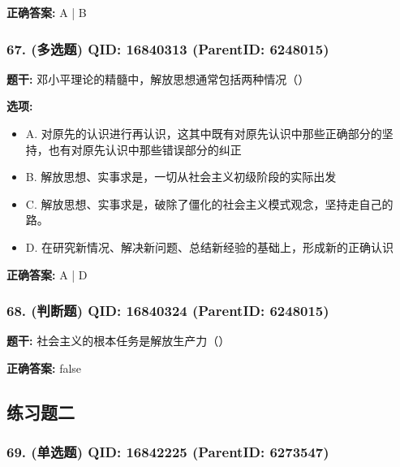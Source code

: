 \documentclass[12pt,UTF8]{ctexart}
\begin{document}
\textbf{正确答案:}
A | B

\vspace{0.3em}\hrulefill\vspace{0.7em}

\subsubsection*{67. (多选题) \small QID: 16840313 (ParentID: 6248015)}

\textbf{题干:}
邓小平理论的精髓中，解放思想通常包括两种情况（）



\textbf{选项:}
\begin{itemize}[leftmargin=*]

  \item A. 对原先的认识进行再认识，这其中既有对原先认识中那些正确部分的坚持，也有对原先认识中那些错误部分的纠正

  \item B. 解放思想、实事求是，一切从社会主义初级阶段的实际出发

  \item C. 解放思想、实事求是，破除了僵化的社会主义模式观念，坚持走自己的路。

  \item D. 在研究新情况、解决新问题、总结新经验的基础上，形成新的正确认识

\end{itemize}

\textbf{正确答案:}
A | D

\vspace{0.3em}\hrulefill\vspace{0.7em}

\subsubsection*{68. (判断题) \small QID: 16840324 (ParentID: 6248015)}

\textbf{题干:}
社会主义的根本任务是解放生产力（）



\textbf{正确答案:}
false

\vspace{0.3em}\hrulefill\vspace{0.7em}

\subsection*{练习题二}

\subsubsection*{69. (单选题) \small QID: 16842225 (ParentID: 6273547)}
\end{document}
